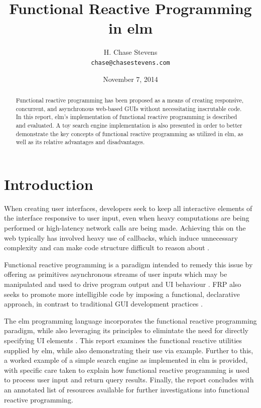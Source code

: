 \documentclass[12pt]{article}
\begin{document}
\title{Functional Reactive Programming in elm}
\author{H. Chase Stevens\\
        \texttt{chase@chasestevens.com}
        }
\date{November 7, 2014}

\maketitle

\begin{abstract}
Functional reactive programming has been proposed as a means of 
creating responsive, concurrent, and asynchronous web-based GUIs without necessitating inscrutable code. In this report, elm's implementation of functional reactive programming
is described and evaluated. A toy search engine implementation is also
presented in order to better demonstrate the key concepts of functional
reactive programming as utilized in elm, as well as its relative advantages 
and disadvantages.
\end{abstract}



\section{Introduction}
When creating user interfaces, developers seek to keep all interactive elements of the interface responsive to user input, even when heavy computations are being performed or high-latency network calls are being made. Achieving this on the web typically has involved heavy use of callbacks, which induce unnecessary complexity and can make code structure difficult to reason about \citep{czaplicki_2012}.

Functional reactive programming is a paradigm intended to remedy this issue by offering as primitives asynchronous streams of user inputs which may be manipulated and used to drive program output and UI behaviour \citep{staltz_2014}. FRP also seeks to promote more intelligible code by imposing a functional, declarative approach, in contrast to traditional GUI development practices \citep{staltz_2014}. 

The elm programming language incorporates the functional reactive programming paradigm, while also leveraging its principles to elimintate the need for directly specifying UI elements \citep{czaplicki_chong_2013}. This report examines the functional reactive utilities supplied by elm, while also demonstrating their use via example. Further to this, a worked example of a simple search engine as implemented in elm is provided, with specific care taken to explain how functional reactive programming is used to process user input and return query results. Finally, the report concludes with an annotated list of resources available for further investigations into functional reactive programming.
\end{document}
